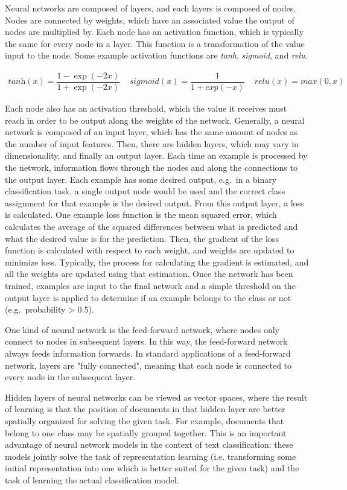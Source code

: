 	
Neural networks are composed of layers, and each layers is composed of nodes. Nodes are connected by weights, which have an associated value the output of nodes are multiplied by. Each node has an activation function, which is typically the same for every node in a layer. This function is a transformation of the value input to the node. Some example activation functions are \textit{tanh}, \textit{sigmoid}, and \textit{relu}.  

\begin{align*}
\textit{tanh}(x) = \dfrac{1 - \exp(-2x)}{ 1 + \exp(-2x)}\;\;\;\;
\textit{sigmoid}(x) = \dfrac{1}{1 + exp(-x)}\;\;\;\;
\textit{relu}(x) = \textit{max}(0, x)
\end{align*}

Each node also has an activation threshold, which the value it receives must reach in order to be output along the weights of the network. Generally, a neural network is composed of an  input layer, which has the same amount of nodes as the number of input  features. Then, there are hidden layers, which may vary in dimensionality, and finally an output layer. Each time an example is processed by the network, information flows through the nodes and along the connections to the output layer. Each example has some desired output, e.g.\ in a binary classification task, a single output node would be used and the correct class assignment for that example is the desired output. From this output layer, a loss is calculated. One example loss function is the mean squared error, which calculates the average of the squared differences between what is predicted and what the desired value is for the prediction. Then, the gradient of the loss function is calculated with respect to each weight, and weights are updated to minimize loss. Typically, the process for calculating the gradient is estimated, and all the weights are updated using that estimation. Once the network has been trained, examples are input to the final network and a simple threshold on the output layer is applied to determine if an example belongs to the class or not (e.g.\ probability > 0.5). 

One kind of neural network is the feed-forward network, where nodes only connect to nodes in subsequent layers. In this way, the feed-forward network always feeds information forwards. In standard applications of a feed-forward network, layers are "fully connected", meaning that each node is connected to every node in the subsequent layer. 

Hidden layers of neural networks can be viewed as vector spaces, where the result of learning is that the position of documents in that hidden layer are better spatially organized for solving the given task. For example, documents that belong to one class may be spatially grouped together. This is an important advantage of neural network models in the context of text classification: these models jointly solve the task of representation learning (i.e. transforming some initial representation into one which is better suited for the given task) and the task of learning the actual classification model.

